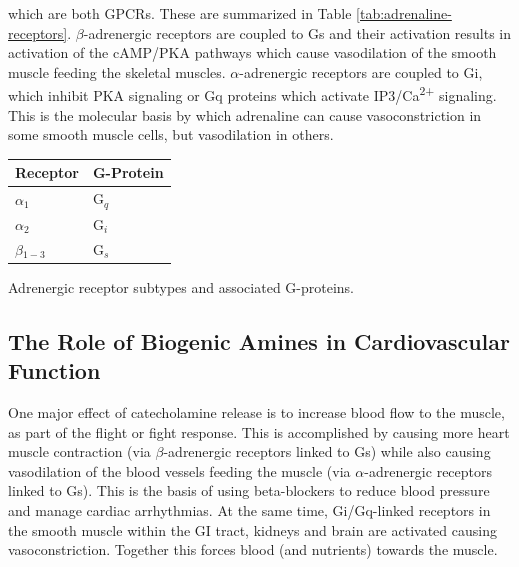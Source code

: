 \documentclass{tufte-handout}
\begin{document}

 which are both GPCRs.  These are summarized in Table \ref{tab:adrenaline-receptors}.  $\beta$-adrenergic receptors are coupled to Gs and their activation results in activation of the cAMP/PKA pathways which cause vasodilation of the smooth muscle feeding the skeletal muscles.  $\alpha$-adrenergic receptors are coupled to Gi, which inhibit PKA signaling or Gq proteins which activate IP3/Ca\textsuperscript{2+} signaling.  This is the molecular basis by which adrenaline can cause vasoconstriction in some smooth muscle cells, but vasodilation in others.

\begin{margintable}[+1cm]
  \centering
  \begin{tabular}{ll}
    \toprule
    Receptor & G-Protein \\
    \midrule
    $\alpha$$_1$ & G$_q$ \\
    $\alpha$$_2$ & G$_i$ \\
    $\beta$$_{1-3}$ & G$_s$ \\
    \bottomrule
  \end{tabular}
  \caption{Adrenergic receptor subtypes and associated G-proteins.}
  \label{tab:adrenaline-receptors}
\end{margintable}

\subsection{The Role of Biogenic Amines in Cardiovascular Function}

One major effect of catecholamine release is to increase blood flow to the muscle, as part of the flight or fight response.  This is accomplished by causing more heart muscle contraction (via $\beta$-adrenergic receptors linked to Gs) while also causing vasodilation of the blood vessels feeding the muscle (via $\alpha$-adrenergic receptors linked to Gs).  This is the basis of using beta-blockers to reduce blood pressure and manage cardiac arrhythmias. At the same time, Gi/Gq-linked receptors in the smooth muscle within the GI tract, kidneys and brain are activated causing vasoconstriction.  Together this forces blood (and nutrients) towards the muscle.  
\end{document}
